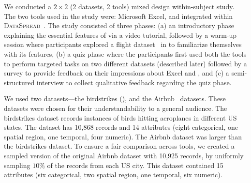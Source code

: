  We conducted a $2 \times 2$ (2 datasets, 2 tools) mixed design within-subject study. The two tools used in the study were: Microsoft Excel, and \noah integrated within {\scshape DataSpread}~\cite{dataspread}. 
The study consisted of three phases: (a) an introductory phase explaining
the essential features of \noah via a video tutorial, followed by a warm-up session where participants explored a flight dataset~\cite{web:flight} in \noah 
to familiarize themselves with its features,
(b) a quiz phase where the participants first used both the tools
to perform targeted tasks on two different datasets (described later) 
followed by a survey to provide feedback on their impressions about Excel and \noah, and
(c) a semi-structured interview to collect qualitative feedback regarding the quiz phase. 

 We used two datasets---the birdstrikes (), and the Airbnb~\cite{web:airbnb} datasets. These datasets were chosen for their understandability to a general audience. The birdstrikes dataset records instances of birds hitting aeroplanes in different US states. The dataset has 10,868 records and 14 attributes (eight categorical, one spatial region, one temporal, four numeric). 
The Airbnb dataset was larger than the birdstrikes dataset. To ensure a fair comparison across tools, we created a sampled version of the original Airbnb dataset with 10,925 records, by uniformly sampling $10\%$ of the records from each US city. This dataset contained 15 attributes (six categorical, two spatial region, one temporal, six numeric).


